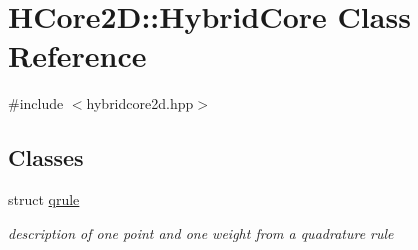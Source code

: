 \hypertarget{classHCore2D_1_1HybridCore}{}\section{H\+Core2D\+:\+:Hybrid\+Core Class Reference}
\label{classHCore2D_1_1HybridCore}


{\ttfamily \#include $<$hybridcore2d.\+hpp$>$}

\subsection*{Classes}
\begin{DoxyCompactItemize}
\item 
struct \hyperlink{structHCore2D_1_1HybridCore_1_1qrule}{qrule}
\begin{DoxyCompactList}\small\item\em description of one point and one weight from a quadrature rule \end{DoxyCompactList}\end{DoxyCompactItemize}
